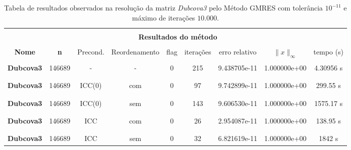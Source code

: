 \begin{table}[ht]
    \centering
    \begin{tabular}{|c|c|c|c|c|c|c|c|c|}
        \hline \rowcolor{Gray}
        \multicolumn{9}{|c|}{\bfseries Tabela do Método Gradientes Conjugados com tolerância $10^{-11}$ e máximo de iterações $10.000$ }\\
        \hline \rowcolor{Gray}  \multicolumn{2}{|c|}{} & \multicolumn{7}{|c|}{} \\
         [-1em]  \rowcolor{Gray}
         \multicolumn{2}{|c|}{\bfseries Informações da matriz } & \multicolumn{7}{|c|}{\bfseries Resultados do método }\\
         \hline \rowcolor{Gray} & & & & & & & & \\
         [-1em]
         \rowcolor{Gray}
         \bfseries Nome & \bfseries n & Precond. & Reordenamento &  flag & iterações &
         erro relativo &
         $\|x\|_\infty$  & tempo (s) \\
         \hline & & & & & & & & \\
         [-1em] \bfseries Dubcova3 & 146689 & - & - & 0 & 215 & 9.438705e-11 & 1.000000e+00 & 4.30956 s \\ & & & & & & & &  \\ [-1em] \hline \\
         [-1em] \bfseries Dubcova3 & 146689 & ICC(0) & com & 0 & 97 & 9.742899e-11 & 1.000000e+00 & 299.55 s \\ & & & & & & & &  \\ [-1em] \hline \\
         [-1em] \bfseries Dubcova3 & 146689 & ICC(0) & sem & 0 & 143 & 9.606530e-11 & 1.000000e+00 & 1575.17 s \\ & & & & & & & & \\ [-1em] \hline \\
         [-1em] \bfseries Dubcova3 & 146689 & ICC & com & 0 & 26 & 2.954087e-11 & 1.000000e+00 & 138.95 s \\ & & & & & & & & \\ [-1em] \hline \\
         [-1em] \bfseries Dubcova3 & 146689 & ICC & sem & 0 & 32 & 6.821619e-11 & 1.000000e+00 & 1842 s \\ \hline
    \end{tabular}
    \caption{Tabela de resultados observados na resolução da matriz \textit{Dubcova3} pelo Método GMRES com tolerância $10^{-11}$ e máximo de iterações $10.000$.}
    \label{tab:resultados-Dub}
\end{table}